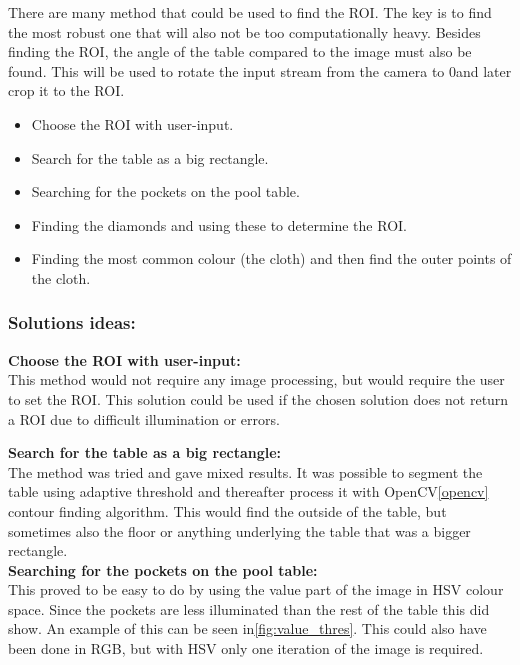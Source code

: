 There are many method that could be used to find the ROI. The key is to find the most robust one that will also not be too computationally heavy. Besides finding the ROI, the angle of the table compared to the image must also be found. This will be used to rotate the input stream from the camera to 0\degree and later crop it to the ROI.

\begin{itemize}
\setlength{\itemsep}{0mm}
	\item Choose the ROI with user-input.
	\item Search for the table as a big rectangle.
	\item Searching for the pockets on the pool table.
	\item Finding the diamonds and using these to determine the ROI.
	\item Finding the most common colour (the cloth) and then find the outer points of the cloth.
\end{itemize}

\subsubsection{Solutions ideas:}

\textbf{Choose the ROI with user-input:}\\
This method would not require any image processing, but would require the user to set the ROI. This solution could be used if the chosen solution does not return a ROI due to difficult illumination or errors.

\textbf{Search for the table as a big rectangle:}\\
The method was tried and gave mixed results. It was possible to segment the table using adaptive threshold and thereafter process it with OpenCV\ref{opencv} contour finding algorithm. This would find the outside of the table, but sometimes also the floor or anything underlying the table that was a bigger rectangle.\\


\textbf{Searching for the pockets on the pool table:}\\
This proved to be easy to do by using the value part of the image in HSV colour space. Since the pockets are less illuminated than the rest of the table this did show. An example of this can be seen in\ref{fig:value_thres}. This could also have been done in RGB, but with HSV only one iteration of the image is required.

